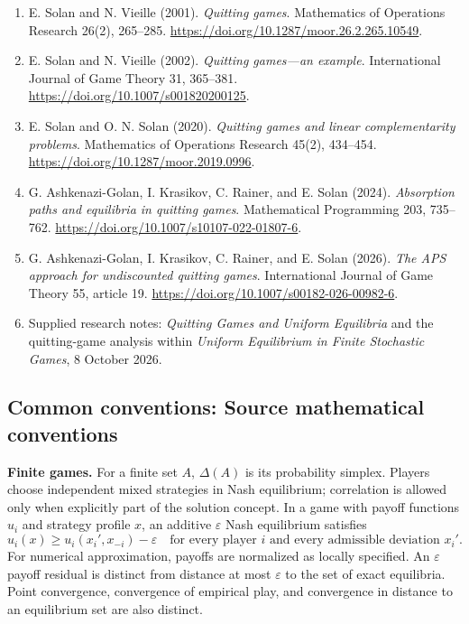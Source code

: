 \documentclass[11pt,a4paper]{article}
\begin{document}
\begin{enumerate}
	\item[S1] E. Solan and N. Vieille (2001).
	\emph{Quitting games}. Mathematics of Operations Research 26(2),
	265--285. \url{https://doi.org/10.1287/moor.26.2.265.10549}.
	\item[S2] E. Solan and N. Vieille (2002).
	\emph{Quitting games---an example}.
	International Journal of Game Theory 31, 365--381.
	\url{https://doi.org/10.1007/s001820200125}.
	\item[S3] E. Solan and O. N. Solan (2020).
	\emph{Quitting games and linear complementarity problems}.
	Mathematics of Operations Research 45(2), 434--454.
	\url{https://doi.org/10.1287/moor.2019.0996}.
	\item[S4] G. Ashkenazi-Golan, I. Krasikov, C. Rainer, and E. Solan (2024).
	\emph{Absorption paths and equilibria in quitting games}.
	Mathematical Programming 203, 735--762.
	\url{https://doi.org/10.1007/s10107-022-01807-6}.
	\item[S5] G. Ashkenazi-Golan, I. Krasikov, C. Rainer, and E. Solan (2026).
	\emph{The APS approach for undiscounted quitting games}.
	International Journal of Game Theory 55, article 19.
	\url{https://doi.org/10.1007/s00182-026-00982-6}.
	\item[S6] Supplied research notes: \emph{Quitting Games and Uniform
		Equilibria} and the quitting-game analysis within \emph{Uniform
		Equilibrium in Finite Stochastic Games}, 8 October 2026.
\end{enumerate}

\subsection*{Common conventions: Source mathematical conventions}

\textbf{Finite games.} For a finite set $A$, $\Delta(A)$ is its probability
simplex. Players choose independent mixed strategies in Nash equilibrium;
correlation is allowed only when explicitly part of the solution concept.
In a game with payoff functions $u_i$ and strategy profile $x$, an additive
$\varepsilon$ Nash equilibrium satisfies
\[
 u_i(x)\geq u_i(x_i',x_{-i})-\varepsilon
 \quad\text{for every player $i$ and every admissible deviation $x_i'$}.
\]
For numerical approximation, payoffs are normalized as locally specified.
An $\varepsilon$ payoff residual is distinct from distance at most
$\varepsilon$ to the set of exact equilibria. Point convergence, convergence
of empirical play, and convergence in distance to an equilibrium set are
also distinct.
\end{document}
